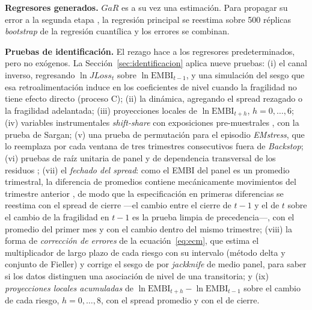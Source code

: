 \textbf{Regresores generados.} $GaR$ es a su vez una estimación. Para propagar su error a la segunda etapa \citep{Pagan1984}, la regresión principal se reestima sobre 500 réplicas \textit{bootstrap} de la regresión cuantílica y los errores se combinan.

\textbf{Pruebas de identificación.} El rezago hace a los regresores predeterminados, pero no exógenos. La Sección~\ref{sec:identificacion} aplica nueve pruebas: (i) el canal inverso, regresando $\ln JLoss_t$ sobre $\ln\mathrm{EMBI}_{t-1}$, y una simulación del sesgo que esa retroalimentación induce en los coeficientes de nivel cuando la fragilidad no tiene efecto directo (proceso C); (ii) la dinámica, agregando el spread rezagado o la fragilidad adelantada; (iii) proyecciones locales \citep{Jorda2005} de $\ln\mathrm{EMBI}_{t+h}$, $h=0,\dots,6$; (iv) variables instrumentales \textit{shift-share} con exposiciones pre-muestrales \citep{GoldsmithPinkhamSorkinSwift2020}, con la prueba de Sargan; (v) una prueba de permutación para el episodio \textit{EMstress}, que lo reemplaza por cada ventana de tres trimestres consecutivos fuera de \textit{Backstop}; (vi) pruebas de raíz unitaria de panel \citep{MaddalaWu1999} y de dependencia transversal de los residuos \citep{Pesaran2004}; (vii) el \emph{fechado del spread}: como el EMBI del panel es un promedio trimestral, la diferencia de promedios contiene mecánicamente movimientos del trimestre anterior \citep{Working1960}, de modo que la especificación en primeras diferencias se reestima con el spread de cierre ---el cambio entre el cierre de $t-1$ y el de $t$ sobre el cambio de la fragilidad en $t-1$ es la prueba limpia de precedencia---, con el promedio del primer mes y con el cambio dentro del mismo trimestre; (viii) la forma de \emph{corrección de errores} de la ecuación~\eqref{eq:ecm}, que estima el multiplicador de largo plazo de cada riesgo con su intervalo (método delta y conjunto de Fieller) y corrige el sesgo de \citet{Nickell1981} por \textit{jackknife} de medio panel, para saber si los datos distinguen una asociación de nivel de una transitoria; y (ix) \emph{proyecciones locales acumuladas} de $\ln\mathrm{EMBI}_{t+h}-\ln\mathrm{EMBI}_{t-1}$ sobre el cambio de cada riesgo, $h=0,\dots,8$, con el spread promedio y con el de cierre.

